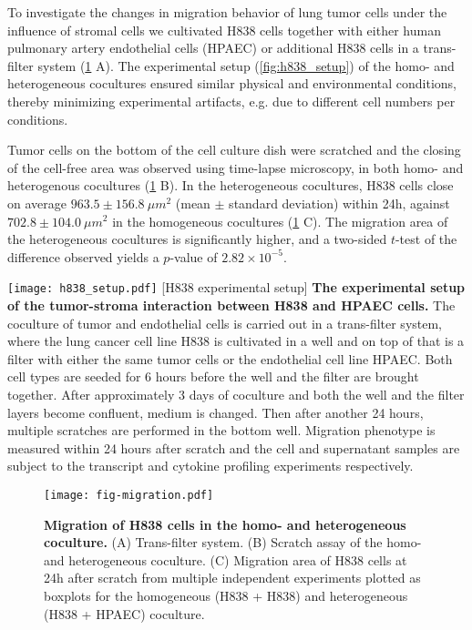 To investigate the changes in migration behavior of lung tumor cells under the 
influence of stromal cells we cultivated  
H838 cells  together with either human pulmonary artery endothelial cells (HPAEC) or additional H838 cells in a trans-filter system (\ref{fig:migration} A).
The experimental setup (\ref{fig:h838_setup}) of the homo- and heterogeneous cocultures ensured 
similar physical and environmental conditions, thereby minimizing 
experimental artifacts, e.g. due to different cell numbers per conditions. 

Tumor cells on the bottom of the cell culture dish were scratched and the 
closing of the cell-free area was observed using time-lapse microscopy, in both
homo- and heterogenous cocultures (\ref{fig:migration} B).
In the heterogeneous cocultures, 
H838 cells close on average $963.5\pm156.8\ \mu m^2$ 
(mean $\pm$ standard deviation) within 24h, 
against $702.8\pm104.0\ \mu m^2$ in the homogeneous cocultures 
(\ref{fig:migration} C). 
The migration area of the heterogeneous cocultures is significantly higher, and
a two-sided  $t$-test of the difference observed yields a $p$-value of 
$2.82 \times 10^{-5}$.

\begin{center}
\captionsetup{labelformat=prepage}
\texttt{[image: h838\_setup.pdf]}
\newpage
[H838 experimental setup]{
{\bf The experimental setup of the tumor-stroma interaction 
between H838 and HPAEC cells.} 
The coculture of tumor and endothelial cells is carried out
in a trans-filter system, where the lung cancer cell line
H838 is cultivated in a well and on top of that is a filter
with either the same tumor cells or the endothelial cell
line HPAEC. Both cell types are seeded for 6 hours before 
the well and the filter are brought together. After 
approximately 3 days of coculture and both the well and the 
filter layers become confluent, medium is changed. Then
after another 24 hours, multiple scratches are performed
in the bottom well. Migration phenotype is measured within
24 hours after scratch and the cell and supernatant samples 
are subject to the transcript and cytokine profiling 
experiments respectively.
}
\label{fig:h838_setup}
\end{center}

\begin{figure}[!ht]
\begin{center}
\texttt{[image: fig-migration.pdf]}
\end{center}
\caption[H838 migration in homo- and heterogeneous coculture]{
{\bf Migration of H838 cells in the homo- and heterogeneous coculture.} 
(A) Trans-filter system. (B) Scratch assay of the homo- and heterogeneous coculture.
(C) Migration area of H838 cells at 24h after scratch from multiple independent 
experiments 
plotted as 
boxplots for the homogeneous (H838 + H838) and heterogeneous (H838 + HPAEC) 
coculture.
}
\label{fig:migration}
\end{figure}

